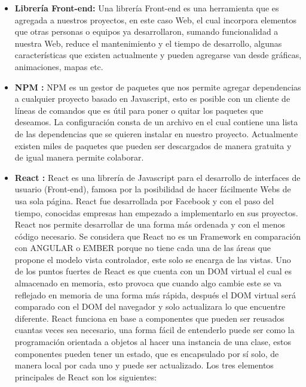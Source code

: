     \begin{itemize}
    
    	\item \textbf{Librería Front-end:} Una librería Front-end \cite{frontEnd2}es una herramienta que es agregada a nuestros proyectos, en este caso Web, el cual incorpora elementos que otras personas o equipos ya desarrollaron, sumando funcionalidad a nuestra Web, reduce el mantenimiento y el tiempo de desarrollo, algunas características que existen actualmente y pueden agregarse van desde gráficas, animaciones, mapas etc. 
      
       \item \textbf{NPM :} NPM \cite{npm} es un gestor de paquetes que nos permite agregar dependencias a cualquier proyecto basado en Javascript, esto es posible con un cliente de líneas de comandos que es útil para poner o quitar los paquetes que deseamos. La configuración consta de un archivo en el cual contiene una lista de las dependencias que se quieren instalar en nuestro proyecto. Actualmente existen miles de paquetes que pueden ser descargados de manera gratuita y de igual manera permite colaborar. 
       
       \item \textbf{ React :} React \cite{react} es una librería de Javascript para el desarrollo de interfaces de usuario (Front-end), famosa por la posibilidad de hacer fácilmente Webs de usa sola página. React fue desarrollada por Facebook y con el paso del tiempo, conocidas empresas han empezado a implementarlo en sus proyectos. 
    React nos permite desarrollar de una forma más ordenada y con el menos código necesario. 
    Se considera que React no es un Framework en comparación con ANGULAR o EMBER porque no tiene cada una de las áreas que propone el modelo vista controlador, este solo se encarga de las vistas. 
    Uno de los puntos fuertes de React es que cuenta con un DOM virtual el cual es almacenado en memoria, esto provoca que cuando algo cambie este se va reflejado en memoria de una forma más rápida, después el DOM virtual será comparado con el DOM del navegador y solo actualizara lo que encuentre diferente. 
    React funciona en base a componentes que pueden ser reusados cuantas veces sea necesario, una forma fácil de entenderlo puede ser como la programación orientada a objetos al hacer una instancia de una clase, estos componentes pueden tener un estado, que es encapsulado por sí solo, de manera local por cada uno y puede ser actualizado.
    Los tres elementos principales de React son los siguientes:
 \begin{itemize}
 

\end{itemize}
\end{itemize}

